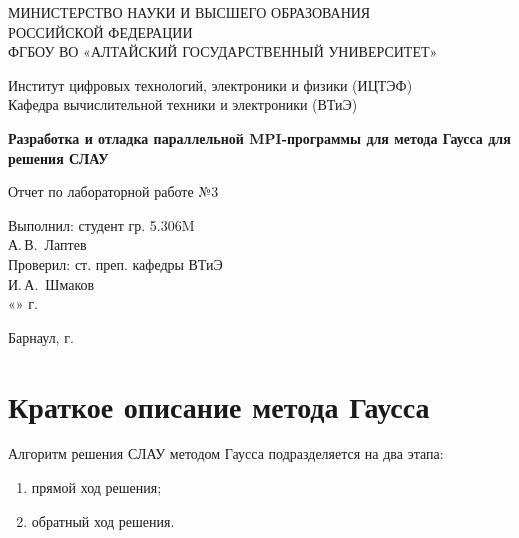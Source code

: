 \documentclass{altsu-bachelor}
\begin{document}
\begin{titlepage}
 \begin{center}
    \normalsize
    МИНИСТЕРСТВО НАУКИ И ВЫСШЕГО ОБРАЗОВАНИЯ \\
    РОССИЙСКОЙ ФЕДЕРАЦИИ \\
    ФГБОУ ВО «АЛТАЙСКИЙ ГОСУДАРСТВЕННЫЙ УНИВЕРСИТЕТ»
    \vfill
     
    Институт цифровых технологий, электроники и физики (ИЦТЭФ) \\
    Кафедра вычислительной техники и электроники (ВТиЭ)
    \vfill
     
    \textbf{Разработка и отладка параллельной MPI-программы для метода Гаусса для решения СЛАУ}
    
    Отчет по лабораторной работе №3
 \end{center}
\vfill
 
\newlength{\ML}
\hfill\begin{minipage}{0.41\textwidth}
  Выполнил: студент гр. 5.306M\\
  \underline{\hspace{\ML}} А.\,В.~Лаптев \\
  Проверил: ст. преп. кафедры ВТиЭ\\
  \underline{\hspace{\ML}} И.\,А.~Шмаков \\
  «\underline{\hspace{1cm}}» \underline{\hspace{3cm}} \the\year г.
\end{minipage}%
\vfill
 
\begin{center}
  Барнаул, \the\year г.
\end{center}
\end{titlepage}

\setcounter{page}{2}
\tableofcontents
\newpage

\section*{Краткое описание метода Гаусса}

Алгоритм решения СЛАУ методом Гаусса подразделяется на два этапа:

\begin{enumerate}
    \item прямой ход решения;
    \item обратный ход решения.
\end{enumerate}
\end{document}
